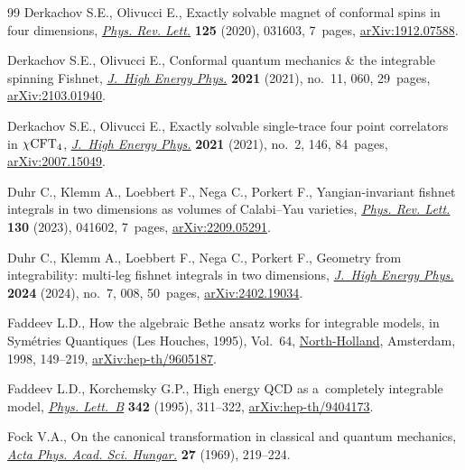 \documentclass[10pt,a4paper]{amsart}
\numberwithin{equation}{section}
\begin{document}
\begin{thebibliography}{99}
Derkachov S.E., Olivucci E., Exactly solvable magnet of conformal spins in four
 dimensions,
 \href{https://doi.org/10.1103/physrevlett.125.031603}{\textit{Phys. Rev.
 Lett.}} \textbf{125} (2020), 031603, 7~pages,
 \href{http://arxiv.org/abs/1912.07588}{arXiv:1912.07588}.

Derkachov S.E., Olivucci E., Conformal quantum mechanics \& the integrable
 spinning {F}ishnet,
 \href{https://doi.org/10.1007/jhep11(2021)060}{\textit{J.~High Energy Phys.}}
 \textbf{2021} (2021), no.~11, 060, 29~pages,
 \href{http://arxiv.org/abs/2103.01940}{arXiv:2103.01940}.

Derkachov S.E., Olivucci E., Exactly solvable single-trace four point
 correlators in {$\chi {\rm CFT}_4$},
 \href{https://doi.org/10.1007/jhep02(2021)146}{\textit{J.~High Energy Phys.}}
 \textbf{2021} (2021), no.~2, 146, 84~pages,
 \href{http://arxiv.org/abs/2007.15049}{arXiv:2007.15049}.

Duhr C., Klemm A., Loebbert F., Nega C., Porkert F., Yangian-invariant fishnet
 integrals in two dimensions as volumes of {C}alabi--{Y}au varieties,
 \href{https://doi.org/10.1103/physrevlett.130.041602}{\textit{Phys. Rev.
 Lett.}} \textbf{130} (2023), 041602, 7~pages,
 \href{http://arxiv.org/abs/2209.05291}{arXiv:2209.05291}.

Duhr C., Klemm A., Loebbert F., Nega C., Porkert F., Geometry from
 integrability: multi-leg fishnet integrals in two dimensions,
 \href{https://doi.org/10.1007/jhep07(2024)008}{\textit{J.~High Energy Phys.}}
 \textbf{2024} (2024), no.~7, 008, 50~pages,
 \href{http://arxiv.org/abs/2402.19034}{arXiv:2402.19034}.

Faddeev L.D., How the algebraic {B}ethe ansatz works for integrable models, in
 Sym\'etries Quantiques ({L}es {H}ouches, 1995), Vol.~64,
 \href{https://doi.org/10.1007/jhep07(2024)008}{North-Holland}, Amsterdam,
 1998, 149--219,
 \href{http://arxiv.org/abs/hep-th/9605187}{arXiv:hep-th/9605187}.

Faddeev L.D., Korchemsky G.P., High energy {QCD} as a~completely integrable
 model, \href{https://doi.org/10.1016/0370-2693(94)01363-H}{\textit{Phys.
 Lett.~B}} \textbf{342} (1995), 311--322,
 \href{http://arxiv.org/abs/hep-th/9404173}{arXiv:hep-th/9404173}.

Fock V.A., On the canonical transformation in classical and quantum mechanics,
 \href{https://doi.org/10.1007/BF03156744}{\textit{Acta Phys. Acad. Sci.
 Hungar.}} \textbf{27} (1969), 219--224.


\end{thebibliography}
\end{document}
